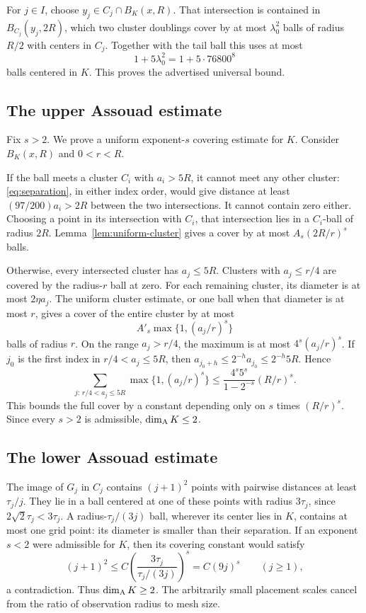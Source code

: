 \documentclass[
  11pt,
]{article}
\theoremstyle{remark}\newtheorem{remark}[theorem]{Remark}
\begin{document}
For $j\in I$, choose $y_j\in C_j\cap B_K(x,R)$. That intersection is contained in $B_{C_j}(y_j,2R)$, which two cluster doublings cover by at most $\lambda_0^2$ balls of radius $R/2$ with centers in $C_j$. Together with the tail ball this uses at most
\[
 1+5\lambda_0^2=1+5\cdot76800^8
\]
balls centered in $K$. This proves the advertised universal bound.

\subsection{The upper Assouad estimate}
Fix $s>2$. We prove a uniform exponent-$s$ covering estimate for $K$. Consider $B_K(x,R)$ and $0<r<R$.

If the ball meets a cluster $C_i$ with $a_i>5R$, it cannot meet any other cluster: \eqref{eq:separation}, in either index order, would give distance at least $(97/200)a_i>2R$ between the two intersections. It cannot contain zero either. Choosing a point in its intersection with $C_i$, that intersection lies in a $C_i$-ball of radius $2R$. Lemma~\ref{lem:uniform-cluster} gives a cover by at most $A_s(2R/r)^s$ balls.

Otherwise, every intersected cluster has $a_j\le5R$. Clusters with $a_j\le r/4$ are covered by the radius-$r$ ball at zero. For each remaining cluster, its diameter is at most $2\eta a_j$. The uniform cluster estimate, or one ball when that diameter is at most $r$, gives a cover of the entire cluster by at most
\[
 A'_s\max\{1,(a_j/r)^s\}
\]
balls of radius $r$. On the range $a_j>r/4$, the maximum is at most $4^s(a_j/r)^s$. If $j_0$ is the first index in $r/4<a_j\le5R$, then $a_{j_0+h}\le2^{-h}a_{j_0}\le2^{-h}5R$. Hence
\[
 \sum_{j:\,r/4<a_j\le5R}\max\{1,(a_j/r)^s\}
 \le\frac{4^s5^s}{1-2^{-s}}(R/r)^s.
\]
This bounds the full cover by a constant depending only on $s$ times $(R/r)^s$. Since every $s>2$ is admissible, $\dim_{\mathrm A} K\le2$.

\subsection{The lower Assouad estimate}
The image of $G_j$ in $C_j$ contains $(j+1)^2$ points with pairwise distances at least $\tau_j/j$. They lie in a ball centered at one of these points with radius $3\tau_j$, since $2\sqrt2\tau_j<3\tau_j$. A radius-$\tau_j/(3j)$ ball, wherever its center lies in $K$, contains at most one grid point: its diameter is smaller than their separation. If an exponent $s<2$ were admissible for $K$, then its covering constant would satisfy
\[
 (j+1)^2\le C\left(\frac{3\tau_j}{\tau_j/(3j)}\right)^s
 =C(9j)^s\qquad(j\ge1),
\]
a contradiction. Thus $\dim_{\mathrm A} K\ge2$. The arbitrarily small placement scales cancel from the ratio of observation radius to mesh size.
\end{document}
